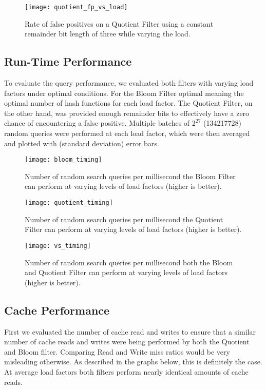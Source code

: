 \documentclass[twoside]{article}
\begin{document}
\begin{figure}[!htb]
\centering
	\texttt{[image: quotient\_fp\_vs\_load]}
	\caption{Rate of false positives on a Quotient Filter using a constant remainder bit length of three while varying the load.}
\end{figure}

\subsection{Run-Time Performance}

To evaluate the query performance, we evaluated both filters with varying load factors under optimal conditions. For the Bloom Filter optimal meaning the optimal number of hash functions for each load factor. The Quotient Filter, on the other hand, was provided enough remainder bits to effectively have a zero chance of encountering a false positive. Multiple batches of $2^{27}$ (134217728) random queries were performed at each load factor, which were then averaged and plotted with (standard deviation) error bars.

\begin{figure}[!htb]
\centering
	\texttt{[image: bloom\_timing]}
	\caption{Number of random search queries per millisecond the Bloom Filter can perform at varying levels of load factors (higher is better).}
\end{figure}

\begin{figure}[!htb]
\centering
	\texttt{[image: quotient\_timing]}
	\caption{Number of random search queries per millisecond the Quotient Filter can perform at varying levels of load factors (higher is better).}
\end{figure}

\begin{figure}[!htb]
\centering
	\texttt{[image: vs\_timing]}
	\caption{Number of random search queries per millisecond both the Bloom and Quotient Filter can perform at varying levels of load factors (higher is better). }
\end{figure}

\subsection{Cache Performance}
First we evaluated the number of cache read and writes to ensure that a similar number of cache reads and writes were being performed by both the Quotient and Bloom filter. Comparing Read and Write miss ratios would be very misleading otherwise. As described in the graphs below, this is definitely the case. At average load factors both filters perform nearly identical amounts of cache reads.
\end{document}
